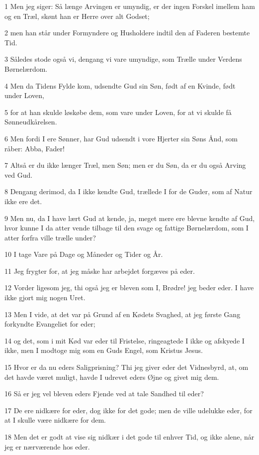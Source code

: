 \par 1 Men jeg siger: Så længe Arvingen er umyndig, er der ingen Forskel imellem ham og en Træl, skønt han er Herre over alt Godset;
\par 2 men han står under Formyndere og Husholdere indtil den af Faderen bestemte Tid.
\par 3 Således stode også vi, dengang vi vare umyndige, som Trælle under Verdens Børnelærdom.
\par 4 Men da Tidens Fylde kom, udsendte Gud sin Søn, født af en Kvinde, født under Loven,
\par 5 for at han skulde løskøbe dem, som vare under Loven, for at vi skulde få Sønneudkårelsen.
\par 6 Men fordi I ere Sønner, har Gud udsendt i vore Hjerter sin Søns Ånd, som råber: Abba, Fader!
\par 7 Altså er du ikke længer Træl, men Søn; men er du Søn, da er du også Arving ved Gud.
\par 8 Dengang derimod, da I ikke kendte Gud, trællede I for de Guder, som af Natur ikke ere det.
\par 9 Men nu, da I have lært Gud at kende, ja, meget mere ere blevne kendte af Gud, hvor kunne I da atter vende tilbage til den svage og fattige Børnelærdom, som I atter forfra ville trælle under?
\par 10 I tage Vare på Dage og Måneder og Tider og År.
\par 11 Jeg frygter for, at jeg måske har arbejdet forgæves på eder.
\par 12 Vorder ligesom jeg, thi også jeg er bleven som I, Brødre! jeg beder eder. I have ikke gjort mig nogen Uret.
\par 13 Men I vide, at det var på Grund af en Kødets Svaghed, at jeg første Gang forkyndte Evangeliet for eder;
\par 14 og det, som i mit Kød var eder til Fristelse, ringeagtede I ikke og afskyede I ikke, men I modtoge mig som en Guds Engel, som Kristus Jesus.
\par 15 Hvor er da nu eders Saligprisning? Thi jeg giver eder det Vidnesbyrd, at, om det havde været muligt, havde I udrevet eders Øjne og givet mig dem.
\par 16 Så er jeg vel bleven eders Fjende ved at tale Sandhed til eder?
\par 17 De ere nidkære for eder, dog ikke for det gode; men de ville udelukke eder, for at I skulle være nidkære for dem.
\par 18 Men det er godt at vise sig nidkær i det gode til enhver Tid, og ikke alene, når jeg er nærværende hos eder.
